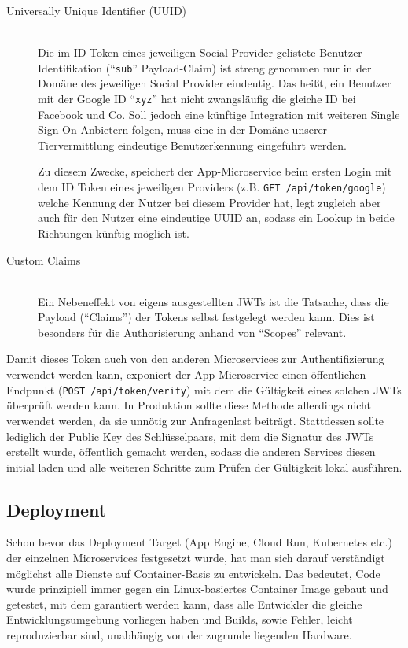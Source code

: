 \documentclass{article}
\begin{document}
\begin{description}
	\item[Universally Unique Identifier (UUID)]
	\hfill \\
	Die im ID Token eines jeweiligen Social Provider gelistete Benutzer Identifikation (\enquote{\texttt{sub}} Payload-Claim) ist streng genommen nur in der Domäne des jeweiligen Social Provider eindeutig. Das heißt, ein Benutzer mit der Google ID \enquote{\texttt{xyz}} hat nicht zwangsläufig die gleiche ID bei Facebook und Co. Soll jedoch eine künftige Integration mit weiteren Single Sign-On Anbietern folgen, muss eine in der Domäne unserer Tiervermittlung eindeutige Benutzerkennung eingeführt werden.
	
	Zu diesem Zwecke, speichert der App-Microservice beim ersten Login mit dem ID Token eines jeweiligen Providers (z.B. \texttt{GET /api/token/google}) welche Kennung der Nutzer bei diesem Provider hat, legt zugleich aber auch für den Nutzer eine eindeutige UUID an, sodass ein Lookup in beide Richtungen künftig möglich ist. 
	
	\item[Custom Claims]
	\hfill \\
	Ein Nebeneffekt von eigens ausgestellten JWTs ist die Tatsache, dass die Payload (\enquote{Claims}) der Tokens selbst festgelegt werden kann. Dies ist besonders für die Authorisierung anhand von \enquote{Scopes} relevant.
\end{description}

Damit dieses Token auch von den anderen Microservices zur Authentifizierung verwendet werden kann, exponiert der App-Microservice einen öffentlichen Endpunkt (\texttt{POST /api/token/verify}) mit dem die Gültigkeit eines solchen JWTs überprüft werden kann. In Produktion sollte diese Methode allerdings nicht verwendet werden, da sie unnötig zur Anfragenlast beiträgt. Stattdessen sollte lediglich der Public Key des Schlüsselpaars, mit dem die Signatur des JWTs erstellt wurde, öffentlich gemacht werden, sodass die anderen Services diesen initial laden und alle weiteren Schritte zum Prüfen der Gültigkeit lokal ausführen. 


\subsection{Deployment}
\label{sec:app-deployment}

Schon bevor das Deployment Target (App Engine, Cloud Run, Kubernetes etc.) der einzelnen Microservices festgesetzt wurde, hat man sich darauf verständigt möglichst alle Dienste auf Container-Basis zu entwickeln. Das bedeutet, Code wurde prinzipiell immer gegen ein Linux-basiertes Container Image gebaut und getestet, mit dem garantiert werden kann, dass alle Entwickler die gleiche Entwicklungsumgebung vorliegen haben und Builds, sowie Fehler, leicht reproduzierbar sind, unabhängig von der zugrunde liegenden Hardware. 
\end{document}
